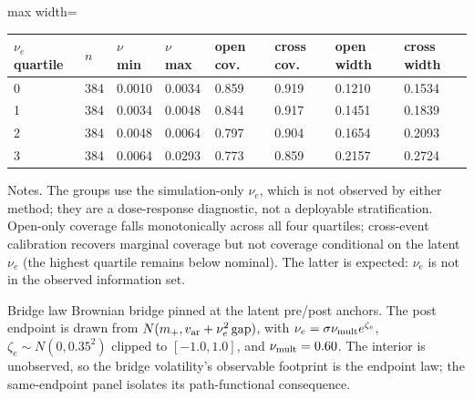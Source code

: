 \begin{table}[!htbp]
\begin{adjustbox}{max width=\linewidth}
\begin{tabular}{@{}llllllll@{}}
\toprule
$\nu_e$ quartile & $n$ & $\nu$ min & $\nu$ max & open cov. & cross cov. & open width & cross width \\
\midrule
0 & 384 & 0.0010 & 0.0034 & 0.859 & 0.919 & 0.1210 & 0.1534 \\
1 & 384 & 0.0034 & 0.0048 & 0.844 & 0.917 & 0.1451 & 0.1839 \\
2 & 384 & 0.0048 & 0.0064 & 0.797 & 0.904 & 0.1654 & 0.2093 \\
3 & 384 & 0.0064 & 0.0293 & 0.773 & 0.859 & 0.2157 & 0.2724 \\
\bottomrule
\end{tabular}
\end{adjustbox}
\vspace{0.5em}
\par\noindent\begin{minipage}{\linewidth}\raggedright{\scriptsize Notes. The groups use the simulation-only $\nu_e$, which is not observed by either method; they are a dose-response diagnostic, not a deployable stratification. Open-only coverage falls monotonically across all four quartiles; cross-event calibration recovers marginal coverage but not coverage conditional on the latent $\nu_e$ (the highest quartile remains below nominal). The latter is expected: $\nu_e$ is not in the observed information set.}\end{minipage}\par

\par\noindent\begin{minipage}{\linewidth}\raggedright{\scriptsize Bridge law Brownian bridge pinned at the latent pre/post anchors. The post endpoint is drawn from $N(m_+, v_{\rm ar}+\nu_e^2\,\mathrm{gap})$, with $\nu_e=\sigma\nu_{\rm mult}e^{\zeta_e}$, $\zeta_e\sim N(0,0.35^2)$ clipped to $[-1.0,1.0]$, and $\nu_{\rm mult}=0.60$. The interior is unobserved, so the bridge volatility's observable footprint is the endpoint law; the same-endpoint panel isolates its path-functional consequence.}\end{minipage}\par

\end{table}
